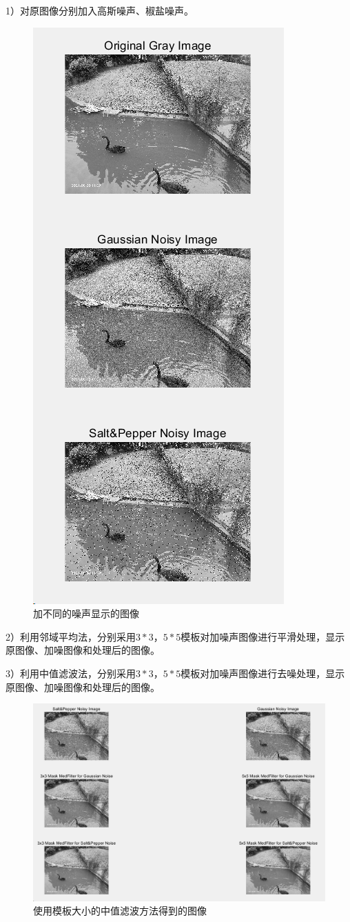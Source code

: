 \documentclass[UTF8]{article} %
\begin{document}
	1）对原图像分别加入高斯噪声、椒盐噪声。
	\begin{figure}[H]
		\centering
		\includegraphics[width=0.35\linewidth]{screenshot008}
		\caption{加不同的噪声显示的图像}
		\label{fig:3-1}
	\end{figure}
	
	
	2）利用邻域平均法，分别采用$3*3$，$5*5$模板对加噪声图像进行平滑处理，显示原图像、加噪图像和处理后的图像。
	
	3）利用中值滤波法，分别采用$3*3$，$5*5$模板对加噪声图像进行去噪处理，显示原图像、加噪图像和处理后的图像。
	\begin{figure}[H]
		\centering
		\includegraphics[width=0.85\linewidth]{screenshot009}
		\caption{使用模板大小的中值滤波方法得到的图像}
		\label{fig:3-2}
	\end{figure}
\end{document}
